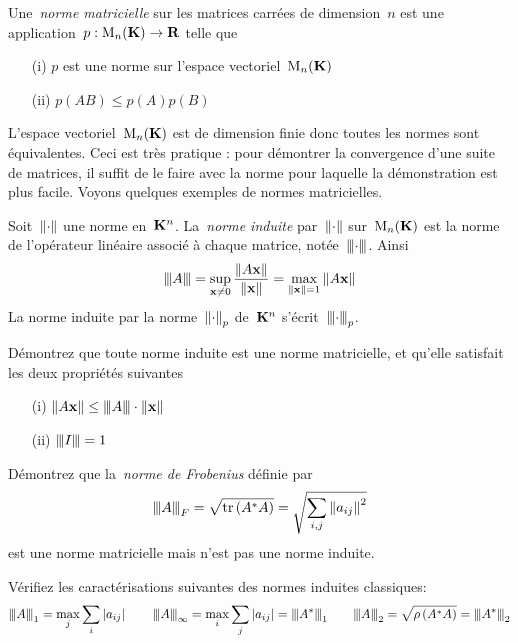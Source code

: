 \begin{definition}
	Une~\emph{norme matricielle} sur les matrices carrées de dimension~$n$ est
	une application~$p:\M_n(\K)\to\R$ telle que
	\begin{enumerate}
		\item[(i)] $p$ est une norme sur l'espace vectoriel~$\M_n(\K)$
		\item[(ii)] $p(AB) \le p(A) p(B)$
	\end{enumerate}
\end{definition}

L'espace vectoriel~$\M_n(\K)$ est de dimension finie donc toutes les normes
sont équivalentes.  Ceci est très pratique : pour démontrer la convergence
d'une suite de matrices, il suffit de le faire avec la norme pour laquelle la
démonstration est plus facile.  Voyons quelques exemples de normes
matricielles.


\begin{definition}
	Soit~$\Abs\cdot$ une norme en~$\K^n$.  La~\emph{norme induite}
	par~$\Abs\cdot$ sur~$\M_n(\K)$ est la norme de l'opérateur
	linéaire %
	associé à chaque matrice, notée~$\ABS\cdot$.  Ainsi
	\[
		\ABS{A}
		=
		\sup_{\x\neq0}\frac{\Abs{A\x}}{\Abs\x}
		=
		\max_{\Abs\x=1}\Abs{A\x}
	\]
	La norme induite par la norme~$\Abs\cdot_p$ de~$\K^n$
	s'écrit~$\ABS\cdot_p$.
\end{definition}

\begin{exercice}
	Démontrez que toute norme induite est une norme matricielle, et qu'elle
	satisfait les deux propriétés suivantes
	\begin{enumerate}
		\item[(i)] $\Abs{A\x}\le\ABS A\cdot\Abs\x$
		\item[(ii)] $\ABS I = 1$
	\end{enumerate}
\end{exercice}

\begin{exercice}
	Démontrez que la~\emph{norme de Frobenius} définie par
	\[
		\ABS A_F
		=
		\sqrt{\mathrm{tr}\parens{A^*A}}
		=
		\sqrt{\sum_{i,j}\Abs{a_{ij}}^2}
	\]
	est une norme matricielle mais n'est pas une norme induite.
\end{exercice}


\begin{exercice}
	Vérifiez les caractérisations suivantes des normes induites classiques:
	\[
		\ABS A_1      = \max_j\sum_i\abs{a_{ij}}
		\qquad
		\ABS A_\infty = \max_i\sum_j\abs{a_{ij}} = \ABS{A^*}_1
		\qquad
		\ABS A_2      = \sqrt{\rho\parens{A^*A}} = \ABS{A^*}_2
	\]
\end{exercice}

